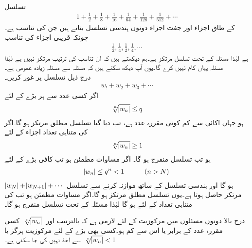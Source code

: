 \quad {}\\
تسلسل
\begin{align*}
1+\frac{1}{2}+\frac{1}{8}+\frac{1}{16}+\frac{1}{64}+\frac{1}{128}+\frac{1}{512}+\cdots
\end{align*}
کے طاق اجزاء اور جفت اجزاء دونوں ہندسی تسلسل بناتے ہیں جن کی تناسب  ہے۔چونکہ قریبی اجزاء کی تناسب
\begin{align*}
\frac{1}{2},\frac{1}{4},\frac{1}{2},\frac{1}{4},\cdots
\end{align*}
ہے لہٰذا مسئلہ  کے تحت تسلسل مرتکز ہے۔ہم دیکھتے ہیں کہ ان تناسب کی ترتیب مرتکز نہیں ہے لہٰذا  مسئلہ  یہاں کام نہیں کرے گا۔یوں آپ دیکھ سکتے ہیں کہ مسئلہ  سے مسئلہ  زیادہ عمومی ہے۔
\quad {}\\
درج ذیل تسلسل پر غور کریں۔
\begin{align*}
w_!+w_2+w_3+\cdots
\end{align*}
اگر کسی عدد  سے ہر بڑے   کے لئے
\begin{align}\label{مساوات_ترتیب_جذری_الف}
\sqrt[\leftroot{-2}n]{\abs{w_n}}\le q
\end{align}
ہو جہاں  اکائی سے کم کوئی مقررہ عدد ہے، تب دیا گیا تسلسل مطلق مرتکز ہو گا۔اگر  کی متناہی تعداد اجزاء  کے لئے 
\begin{align}\label{مساوات_ترتیب_جذری_ب}
\sqrt[\leftroot{-2}n]{\abs{w_n}}\ge 1
\end{align}
ہو تب تسلسل منفرج ہو گا۔
\quad
اگر مساوات  مطمئن ہو تب کافی بڑے  کے لئے
\begin{align*}
\abs{w_n}\le q^n<1 \quad \quad \quad (n>N)
\end{align*}
ہو گا اور ہندسی تسلسل کے ساتھ موازنہ کرنے سے تسلسل
$\,\abs{w_N}+\abs{w_{N+1}}+\cdots\,$
مرتکز حاصل ہوتا ہے۔یوں تسلسل  مطلق مرتکز ہو گا۔اگر مساوات  مطمئن ہو تب  کی متناہی تعداد کے لئے   ہو گا  لہٰذا مسئلہ  کے تحت تسلسل منفرج ہو گا۔


درج بالا دونوں مسئلوں میں مرکوزیت کے لئے لازمی ہے کہ بالترتیب  اور 
$\,\sqrt[\leftroot{-2}n]{\abs{w_n}}\,$
 کسی مقررہ عدد  کے برابر یا اس سے کم ہو۔کسی بھی بڑے  کے لئے مرکوزیت ہرگز    یا 
$\,\sqrt[\leftroot{-2}n]{\abs{w_n}}<1\,$
سے اخذ نہیں کی جا سکتی ہے۔


